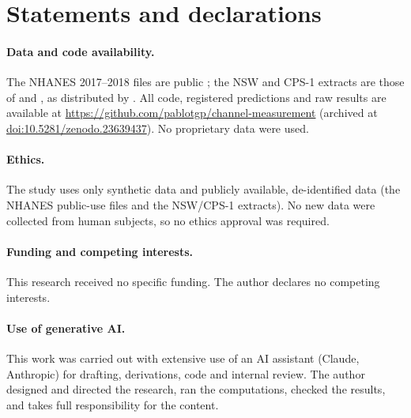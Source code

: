 \section*{Statements and declarations}

\paragraph{Data and code availability.} The NHANES 2017--2018 files are public \citep{nchs2020}; the NSW and CPS-1 extracts are those of \citet{dehejia1999} and \citet{lalonde1986}, as distributed by \citet{cunningham2021}. All code, registered predictions and raw results are available at \url{https://github.com/pablotgp/channel-measurement} (archived at \href{https://doi.org/10.5281/zenodo.23639437}{doi:10.5281/zenodo.23639437}). No proprietary data were used.

\paragraph{Ethics.} The study uses only synthetic data and publicly available, de-identified data (the NHANES public-use files and the NSW/CPS-1 extracts). No new data were collected from human subjects, so no ethics approval was required.

\paragraph{Funding and competing interests.} This research received no specific funding. The author declares no competing interests.

\paragraph{Use of generative AI.} This work was carried out with extensive use of an AI assistant (Claude, Anthropic) for drafting, derivations, code and internal review. The author designed and directed the research, ran the computations, checked the results, and takes full responsibility for the content.

